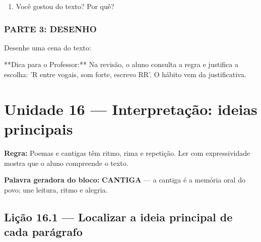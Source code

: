 \begin{exercicio}
\begin{enumerate}
  \item Você gostou do texto? Por quê?
  \begin{center}
  \underline{\hspace{12cm}}
  \end{center}

\end{enumerate}

\subsection*{PARTE 3: DESENHO}

Desenhe uma cena do texto:

\begin{center}
\end{center}

\end{exercicio}

\begin{dica}
**Dica para o Professor:** Na revisão, o aluno consulta a regra e justifica a escolha: 'R entre vogais, som forte, escrevo RR'. O hábito vem da justificativa.
\end{dica}


\chapter{Unidade 16 --- Interpretação: ideias principais}


\textbf{Regra:} Poemas e cantigas têm ritmo, rima e repetição. Ler com expressividade mostra que o aluno compreende o texto.

\textbf{Palavra geradora do bloco:} \textbf{CANTIGA} --- a cantiga é a memória oral do povo; une leitura, ritmo e alegria.

\section{Lição 16.1 --- Localizar a ideia principal de cada parágrafo}

